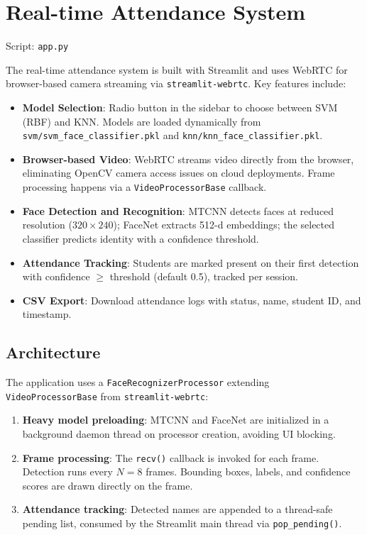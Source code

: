 \documentclass[12pt,a4paper]{article}
\begin{document}
\newpage

\section{Real-time Attendance System}
\label{sec:streamlit}

Script: \texttt{app.py}

The real-time attendance system is built with Streamlit and uses WebRTC for browser-based camera streaming via \texttt{streamlit-webrtc}. Key features include:

\begin{itemize}
    \item \textbf{Model Selection}: Radio button in the sidebar to choose between SVM (RBF) and KNN. Models are loaded dynamically from \texttt{svm/svm\_face\_classifier.pkl} and \texttt{knn/knn\_face\_classifier.pkl}.
    \item \textbf{Browser-based Video}: WebRTC streams video directly from the browser, eliminating OpenCV camera access issues on cloud deployments. Frame processing happens via a \texttt{VideoProcessorBase} callback.
    \item \textbf{Face Detection and Recognition}: MTCNN detects faces at reduced resolution ($320 \times 240$); FaceNet extracts 512-d embeddings; the selected classifier predicts identity with a confidence threshold.
    \item \textbf{Attendance Tracking}: Students are marked present on their first detection with confidence $\ge$ threshold (default 0.5), tracked per session.
    \item \textbf{CSV Export}: Download attendance logs with status, name, student ID, and timestamp.
\end{itemize}

\subsection{Architecture}
\label{subsec:architecture}

The application uses a \texttt{FaceRecognizerProcessor} extending \texttt{VideoProcessorBase} from \texttt{streamlit-webrtc}:
\begin{enumerate}
    \item \textbf{Heavy model preloading}: MTCNN and FaceNet are initialized in a background daemon thread on processor creation, avoiding UI blocking.
    \item \textbf{Frame processing}: The \texttt{recv()} callback is invoked for each frame. Detection runs every $N=8$ frames. Bounding boxes, labels, and confidence scores are drawn directly on the frame.
    \item \textbf{Attendance tracking}: Detected names are appended to a thread-safe pending list, consumed by the Streamlit main thread via \texttt{pop\_pending()}.
\end{enumerate}
\end{document}
